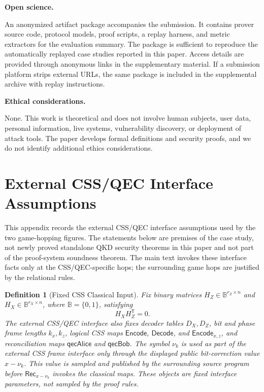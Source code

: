 \documentclass[conference,compsoc]{IEEEtran}
\newtheorem{definition}{Definition}
\begin{document}
\noindent\textbf{Open science.}
\label{app:open-science}

An anonymized artifact package accompanies the submission. It contains prover source code, protocol models, proof scripts, a replay harness, and metric extractors for the evaluation summary. The package is sufficient to reproduce the automatically replayed case studies reported in this paper. Access details are provided through anonymous links in the supplementary material. If a submission platform strips external URLs, the same package is included in the supplemental archive with replay instructions.

\smallskip
\noindent\textbf{Ethical considerations.}
\label{app:ethics}

None. This work is theoretical and does not involve human subjects, user data, personal information, live systems, vulnerability discovery, or deployment of attack tools. The paper develops formal definitions and security proofs, and we do not identify additional ethics considerations.

\section{External CSS/QEC Interface Assumptions}
\label{app:css-correction}
\begingroup
\setlength{\abovedisplayskip}{3pt}
\setlength{\belowdisplayskip}{3pt}
\setlength{\abovedisplayshortskip}{2pt}
\setlength{\belowdisplayshortskip}{2pt}
\setlength{\jot}{1pt}
\setlength{\arraycolsep}{2pt}

This appendix records the external CSS/QEC interface assumptions used by the
two game-hopping figures. The statements below are premises of the case study,
not newly proved standalone QKD security theorems in this paper and not part of
the proof-system soundness theorem. The main text invokes these interface facts
only at the CSS/QEC-specific hops; the surrounding game hops are justified by
the relational rules.

\begin{definition}[Fixed CSS Classical Input]
Fix binary matrices \(H_Z\in\mathbb B^{r_Z\times n}\) and
\(H_X\in\mathbb B^{r_X\times n}\), where \(\mathbb B=\{0,1\}\), satisfying
\[
H_XH_Z^{\mathsf T}=0 .
\]
The external CSS/QEC interface also fixes decoder tables \(D_X,D_Z\), bit and phase frame lengths
\(k_x,k_z\), logical CSS maps \(\mathsf{Encode}\), \(\mathsf{Decode}\), and
\(\mathsf{Encode}_{x,z}\), and reconciliation maps
\(\mathsf{qecAlice}\) and \(\mathsf{qecBob}\). The symbol \(\nu_k\) is used as
part of the external CSS frame interface only through the displayed public
bit-correction value \(x-\nu_k\). This value is sampled and published by the
surrounding source program before \(\mathsf{Rec}_{x-\nu_k}\) invokes the
classical maps. These objects are fixed interface parameters, not sampled by the
proof rules.
\end{definition}
\end{document}
